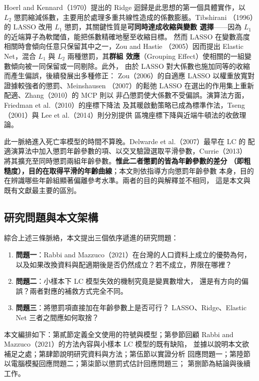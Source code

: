 \documentclass[UTF8, fontset=macnew, a4paper, 12pt]{ctexart}
\begin{document}
Hoerl and Kennard（1970）提出的 Ridge 迴歸是此思想的第一個具體實作，以
$L_2$ 懲罰縮減係數，主要用於處理多重共線性造成的係數膨脹。Tibshirani
（1996）的 LASSO 改用 $L_1$ 懲罰，其關鍵性質是\textbf{可同時達成收縮與變數
選擇}——因為 $L_1$ 的近端算子為軟閾值，能把係數精確地壓至收縮目標。
然而 LASSO 在變數高度相關時會傾向任意只保留其中之一，Zou and Hastie
（2005）因而提出 Elastic Net，混合 $L_1$ 與 $L_2$ 兩種懲罰，其\textbf{群組
效應}（Grouping Effect）使相關的一組變數傾向被一同保留或一同剔除。此外，
由於 LASSO 對大係數也施加同等的收縮而產生偏誤，後續發展出多種修正：
Zou（2006）的自適應 LASSO 以權重放寬對證據較強者的懲罰、Meinshausen
（2007）的鬆弛 LASSO 在選出的作用集上重新配適、Zhang（2010）的 MCP 則以
非凸懲罰使大係數不受偏誤。演算法方面，Friedman et al.（2010）的座標下降法
及其暖啟動策略已成為標準作法，Tseng（2001）與 Lee et al.（2014）則分別提供
區塊座標下降與近端牛頓法的收斂理論。

此一脈絡進入死亡率模型的時間不算晚。Delwarde et al.（2007）最早在 LC 的
配適演算法中加入懲罰年齡參數的項、以交叉驗證選取平滑參數，Currie（2013）
將其擴充至同時懲罰兩組年齡參數。\textbf{惟此二者懲罰的皆為年齡參數的差分
（即粗糙度），目的在取得平滑的年齡曲線}；本文則依指導方向懲罰年齡參數
本身，目的在辨識哪些年齡組顯著偏離參考水準。兩者的目的與解釋並不相同，
這是本文與既有文獻最主要的區別。

\subsection{研究問題與本文架構}

綜合上述三條脈絡，本文提出三個依序遞進的研究問題：

\begin{enumerate}[leftmargin=*]
  \item \textbf{問題一}：Rabbi and Mazzuco（2021）在台灣的人口資料上成立的優勢為何，
        以及如果改換資料與配適期後是否仍然成立？若不成立，界限在哪裡？
  \item \textbf{問題二}：小樣本下 LC 模型失效的機制究竟是變異數增大，
        還是有方向的偏誤？兩者對應的補救方式完全不同。
  \item \textbf{問題三}：將懲罰項直接加在年齡參數上是否可行？
        LASSO、Ridge、Elastic Net 三者之間應如何取捨？
\end{enumerate}

本文編排如下：第貳節定義全文使用的符號與模型；第參節回顧
Rabbi and Mazzuco（2021）的方法內容與小樣本 LC 模型的既有缺陷，
並據以說明本文欲補足之處；第肆節說明研究資料與方法；第伍節以實證分析
回應問題一；第陸節以電腦模擬回應問題二；第柒節以懲罰式估計回應問題三；
第捌節為結論與後續工作。
\end{document}
